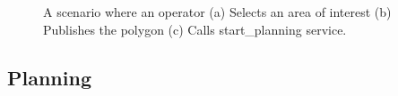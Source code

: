 \begin{figure}
	\centering
	\caption[Operator interaction with Pegasus system; a scenerio.]{\small 
		A scenario where an operator (a) Selects an area of interest (b) Publishes the polygon (c) Calls start\_planning service.}
	
	
	
	
	
	\label{fig:presentation-scenerio-1}
\end{figure}


\subsection{Planning}

